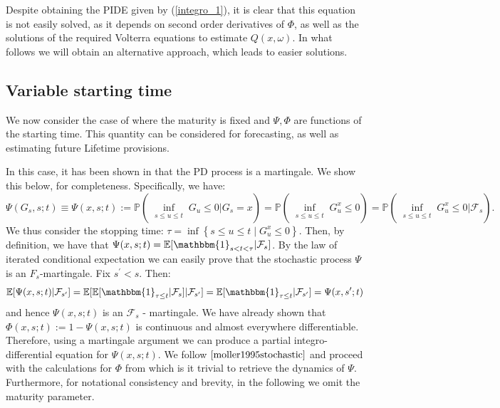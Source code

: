 \documentclass[11pt,reqno]{article}
\theoremstyle{definition}
\begin{document}
Despite obtaining the PIDE given by (\ref{integro_1}), it is clear that this equation is not easily solved, as it depends on second order derivatives of $\Phi$, as well as the solutions of the required Volterra equations to estimate $Q(x,\omega)$. In what follows we will obtain an alternative approach, which leads to easier solutions.

\subsection{Variable starting time}
We now consider the case of where the maturity is fixed and $\Psi,\Phi$ are functions of the starting time. This quantity can be considered for forecasting, as well as estimating future Lifetime provisions. 

In this case, it has been shown in \cite{moller1995stochastic} that the PD process is a martingale. We show this below, for completeness. Specifically, we have:
$$ \Psi(G_s,s;t) \equiv \Psi(x,s;t) := \mathbb{P}(\inf_{\substack{s \leq u \leq t}} G_u \leq 0 | G_s=x) = \mathbb{P}(\inf_{\substack{s \leq u \leq t}} G_u^x \leq 0)= \mathbb{P}(\inf_{\substack{s \leq u \leq t}} G^x_u \leq 0 | \mathcal{F}_s). $$
We thus consider the stopping time:
$\tau=\inf \left\{s \leq u \leq t \mid G^x_{u} \leq 0\right\}$. Then, by
definition, we have that $\Psi(x,s;t)= \mathbb{E}[\mathbbm{1}_{s <t <\tau} | \mathcal{F}_s]$. By the 
law of iterated conditional expectation we can easily prove that the stochastic process $\Psi$ is an $F_s$-martingale. Fix $s^{\prime}<s$. Then:
$$\mathbb{E}[\Psi(x,s;t)|\mathcal{F}_{s'}]=\mathbb{E}[\mathbb{E}[\mathbbm{1}_{ \tau \leq t}| \mathcal{F}_{s}]|\mathcal{F}_{s'} ]=
\mathbb{E}[\mathbbm{1}_{ \tau \leq t} | \mathcal{F}_{s'}]=\Psi(x, s^{\prime};t)$$ and hence
$\Psi(x, s;t)$ is an $\mathcal{F}_{s}$ - martingale. We have already shown that $\Phi(x, s;t):=1-\Psi(x, s;t)$ is continuous and almost everywhere differentiable. Therefore, using a martingale argument we can produce a partial integro-differential equation for $\Psi(x,s;t)$. We follow $\cite{moller1995stochastic}$ and proceed with the calculations for $\Phi$ from which is it trivial to retrieve the dynamics of $\Psi$. Furthermore, for notational consistency and brevity, in the following we omit the maturity parameter. %
\end{document}
